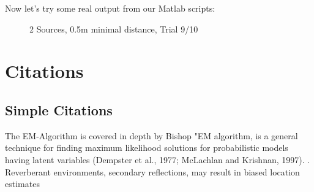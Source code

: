 Now let's try some real output from our Matlab scripts:
\begin{figure}[H]
	\centering
	
	\caption{2 Sources, 0.5m minimal distance, Trial 9/10}
	\label{fig:trial1}
\end{figure}

\newpage
\section{Citations}
\subsection{Simple Citations}
The EM-Algorithm is covered in depth by Bishop "EM algorithm, is a general technique for finding maximum likelihood solutions for probabilistic models having latent variables (Dempster et al., 1977; McLachlan and Krishnan, 1997). \cite[p. 472]{Bishop2006}. Reverberant environments, secondary reflections, may result in biased location estimates \cite[p.1]{Schwartz2014}
